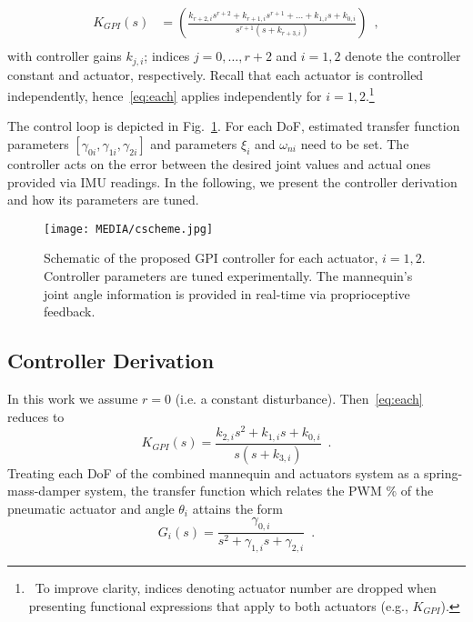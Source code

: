 \documentclass[letterpaper, 10pt, conference]{ieeeconf}      %
\begin{document}
\begin{equation}
\begin{aligned}
K_{GPI}(s) &= \left(\frac{k_{r+2,i}s^{r+2}+k_{r+1,i}s^{r+1}+...+k_{1,i}s + k_{0,i}}{s^{r+1}(s+k_{r+3,i})} \right)\enspace,\\
    \end{aligned}
    \label{eq:each}
\end{equation}
%
with controller gains $k_{j,i}$; indices $j=0,\ldots,r+2$ and $i=1,2$ denote the controller constant and actuator, respectively. 
%
Recall that each actuator is controlled independently, hence~\eqref{eq:each} applies independently for $i=1,2$.\footnote{~To improve clarity, indices denoting actuator number are dropped when presenting functional expressions that apply to both actuators (e.g., $K_{GPI}$).} 




The control loop is depicted in Fig.~\ref{fig:cl}. For each DoF, estimated transfer function parameters $[\gamma_{0i},\gamma_{1i},\gamma_{2i}]$ and parameters $\xi_i$ and $\omega_{ni}$ need to be set. The controller acts on the error between the desired joint values and actual ones provided via IMU readings. 
%
In the following, we present the controller derivation and how its parameters are tuned. 

\begin{figure}[!t]
    \vspace{3pt}
   \centering
     \texttt{[image: MEDIA/cscheme.jpg]}
      \vspace{-16pt}
      \caption{Schematic of the proposed GPI controller for each actuator, $i=1,2$. Controller parameters are tuned experimentally. The mannequin's joint angle information is provided in real-time via proprioceptive feedback.}
      \label{fig:cl}
      \vspace{-6pt}
\end{figure}

\subsection{Controller Derivation}
In this work we assume $r=0$ (i.e. a constant disturbance).  Then~\eqref{eq:each} reduces to
%
\begin{equation}
    K_{GPI}(s) = \frac{k_{2,i}s^2+k_{1,i}s+k_{0,i}}{s(s+k_{3,i})}\enspace.
\end{equation}
%
Treating each DoF of the combined mannequin and actuators system as a spring-mass-damper system, the transfer function which relates the PWM \% of the pneumatic actuator and angle $\theta_i$ %
attains the form
%
\begin{equation}
    G_i(s) = \frac{\gamma_{0,i}}{s^2 + \gamma_{1,i} s + \gamma_{2,i}}\enspace.
    \label{eq:mass}
\end{equation}
 
\end{document}
